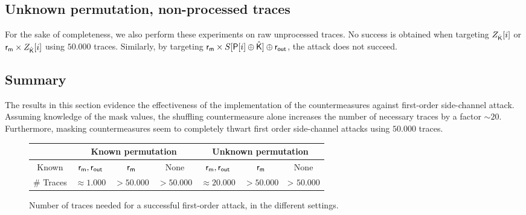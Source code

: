\subsection{Unknown permutation, non-processed traces}

For the sake of completeness, we also perform these experiments on raw unprocessed traces. No success is obtained when targeting $Z_{\hat{\mathsf{K}}}[i]$ or $\mathsf{r_m} \times Z_{\hat{\mathsf{K}}}[i]$ using $50.000$ traces.
Similarly, by targeting $\mathsf{r_m} \times S[\mathsf{P}[i]\oplus \hat{\mathsf{K}}] \oplus \mathsf{r_{out}}$, the attack does not succeed.


\subsection{Summary}
The results in this section evidence the effectiveness of the implementation of the countermeasures against first-order side-channel attack.
Assuming knowledge of the mask values, the shuffling countermeasure alone increases the number of necessary traces by a factor $\sim 20$.
Furthermore, masking countermeasures seem to completely thwart first order side-channel attacks using $50.000$ traces.


\begin{figure}[h!]
\centering
\begin{tabular}{|c|c|c|c|c|c|c|}
  \hline
   & \multicolumn{3}{c|}{Known permutation}&\multicolumn{3}{c|}{Unknown permutation}\\
  \hline
  Known & $\mathsf{r_m}, \mathsf{r_{out}}$ & $\mathsf{r_m} $ &  None & $\mathsf{r_m},\mathsf{r_{out}}$ & $\mathsf{r_m} $  &  None \\
  \hline
  \# Traces& $\approx 1.000$ & $ > 50.000$ & $> 50.000$& $\approx 20.000$ & $ > 50.000$ & > $50.000$\\
  \hline
\end{tabular}
\caption{Number of traces needed for a successful first-order attack, in the different settings.}
\end{figure}

